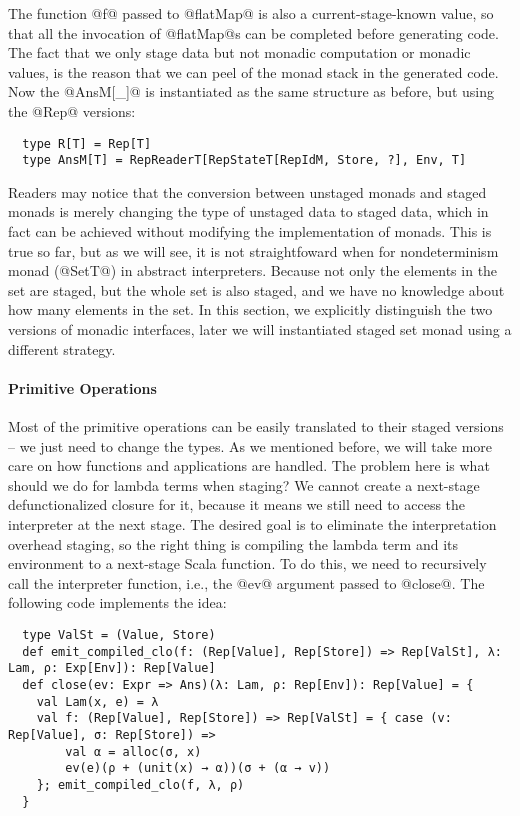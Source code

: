 The function @f@ passed to @flatMap@ is also a current-stage-known value, so
that all the invocation of @flatMap@s can be completed before generating code.
The fact that we only stage data but not monadic computation or monadic
values, is the reason that we can peel of the monad stack in the generated code.
Now the @AnsM[_]@ is instantiated as the same structure as before, but using the
@Rep@ versions:
\begin{lstlisting}
  type R[T] = Rep[T]
  type AnsM[T] = RepReaderT[RepStateT[RepIdM, Store, ?], Env, T]
\end{lstlisting}

Readers may notice that the conversion between unstaged monads and staged monads
is merely changing the type of unstaged data to staged data, which in fact can
be achieved without modifying the implementation of monads. This is true so far,
but as we will see, it is not straightfoward when for nondeterminism monad
(@SetT@) in abstract interpreters. Because not only the elements in the set are
staged, but the whole set is also staged, and we have no knowledge about how
many elements in the set. In this section, we explicitly distinguish the two
versions of monadic interfaces, later we will instantiated staged set monad
using a different strategy.

\paragraph{Primitive Operations} Most of the primitive operations can be easily
translated to their staged versions -- we just need to change the types.
As we mentioned before, we will take more care on how functions and
applications are handled. The problem here is what should we do for
lambda terms when staging? We cannot create a next-stage
defunctionalized closure for it, because it means we still need to
access the interpreter at the next stage. The desired goal is to eliminate the
interpretation overhead staging, so the right thing is compiling the lambda term
and its environment to a next-stage Scala function. To do this, we need to
recursively call the interpreter function, i.e., the @ev@ argument passed to @close@.
The following code implements the idea:

\begin{lstlisting}
  type ValSt = (Value, Store)
  def emit_compiled_clo(f: (Rep[Value], Rep[Store]) => Rep[ValSt], λ: Lam, ρ: Exp[Env]): Rep[Value]
  def close(ev: Expr => Ans)(λ: Lam, ρ: Rep[Env]): Rep[Value] = {
    val Lam(x, e) = λ
    val f: (Rep[Value], Rep[Store]) => Rep[ValSt] = { case (v: Rep[Value], σ: Rep[Store]) =>
        val α = alloc(σ, x)
        ev(e)(ρ + (unit(x) → α))(σ + (α → v))
    }; emit_compiled_clo(f, λ, ρ)
  }
\end{lstlisting}


